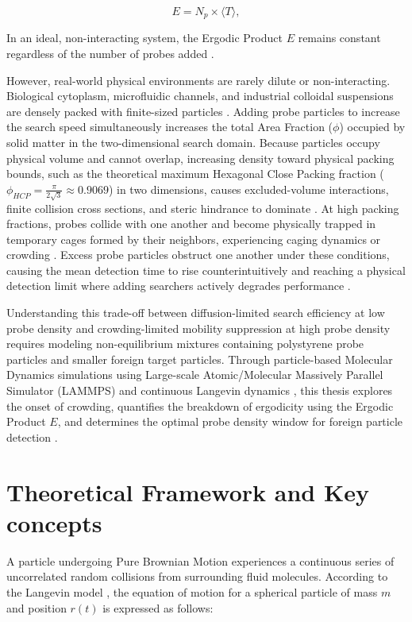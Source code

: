 \begin{equation}
    E = N_p \times \langle T \rangle,
\label{eqn:1.1}
\end{equation}

\noindent In an ideal, non-interacting system, the Ergodic Product $E$ remains constant regardless of the number of probes added \cite{Loverdo2008, Zwanzig2001, Balejado2026}.

\hspace{\parindent} However, real-world physical environments are rarely dilute or non-interacting. Biological cytoplasm, microfluidic channels, and industrial colloidal suspensions are densely packed with finite-sized particles \cite{Weeks2000}. Adding probe particles to increase the search speed simultaneously increases the total Area Fraction ($\phi$) occupied by solid matter in the two-dimensional search domain. Because particles occupy physical volume and cannot overlap, increasing density toward physical packing bounds, such as the theoretical maximum Hexagonal Close Packing fraction ($\phi_{HCP} = \frac{\pi}{2\sqrt{3}}\approx 0.9069$) in two dimensions, causes excluded-volume interactions, finite collision cross sections, and steric hindrance to dominate \cite{Weeks2000,Torquato2002}. At high packing fractions, probes collide with one another and become physically trapped in temporary cages formed by their neighbors, experiencing caging dynamics or crowding \cite{Weeks2000}. Excess probe particles obstruct one another under these conditions, causing the mean detection time to rise counterintuitively and reaching a physical detection limit where adding searchers actively degrades performance \cite{Balejado2026}.

\hspace{\parindent} Understanding this trade-off between diffusion-limited search efficiency at low probe density and crowding-limited mobility suppression at high probe density requires modeling non-equilibrium mixtures containing polystyrene probe particles and smaller foreign target particles. Through particle-based Molecular Dynamics simulations using Large-scale Atomic/Molecular Massively Parallel Simulator (LAMMPS) \cite{Thompson2022} and continuous Langevin dynamics \cite{Coffey2004}, this thesis explores the onset of crowding, quantifies the breakdown of ergodicity using the Ergodic Product $E$, and determines the optimal probe density window for foreign particle detection \cite{balejado2026}.

\section{Theoretical Framework and Key concepts}
\label{sec:1.2}
\hspace{\parindent} A particle undergoing Pure Brownian Motion experiences a continuous series of uncorrelated random collisions from surrounding fluid molecules. According to the Langevin model \cite{Uhlenbeck1930, Coffey2004}, the equation of motion for a spherical particle of mass $m$ and position $r(t)$ is expressed as follows:


